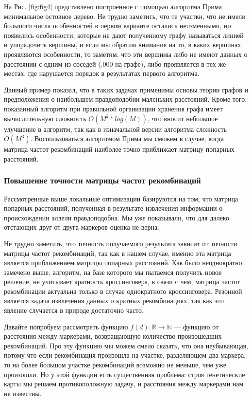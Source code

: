 \documentclass{matmex-diploma-custom}
\begin{document}
На Рис. \ref{fig:fig4} представлено построенное с помощью алгоритма
Прима минимальное остовное дерево. Не трудно заметить, что те участки,
что не имели большого числа особенностей в первом варианте остались
неизменными, но появились особенности, которые не дают полученному
графу называться линией и упорядочить вершины, и если мы обратим
внимание на то, в каких вершинах проявляются особенности, то заметим,
что эти вершины либо не имеют данных о расстоянии с одним из соседей
(.000 на графе), либо проявляется в тех же местах, где нарушается
порядок в результатах первого алгоритма.

Данный пример показал, что в таких задачах применимы основы теории
графов и предположения о наибольшем правдоподобии маленьких
расстояний. Кроме того, показанный алгоритм при правильной организации
хранения графа имеет вычислительную сложность $O(M^2*log(M))$, что
вносит небольшое улучшение в алгоритм, так как в изначальной версии
алгоритма сложность $O(M^3)$. Воспользоваться алгоритмом Прима мы
сможем в случае, когда матрица частот рекомбинаций наиболее точно
приближает матрицу попарных расстояний.

\subsubsection{Повышение точности матрицы частот рекомбинаций}

Рассмотренные выше локальные оптимизации базируются на том, что
матрица попарных расстояний, полученная в результате извлечения
информации о происхождении аллели правдоподобна. Мы уже показывали,
что для далеко отстающих друг от друга маркеров оценка не верна.

Не трудно заметить, что точность получаемого результата зависит от
точности матрицы частот рекомбинаций, так как в нашем случае, именно
эта матрица является приближением матрицы попарных расстояний.  Как
было неоднократно замечено выше, алгоритм, на базе которого мы
пытаемся получить новое решение, не учитывает кратность кроссинговера,
в связи с чем, матрица частот рекомбинации актуальна только в случае
однократного кроссинговера. Резонной является задача извлечения данных
о кратных рекомбинациях, так как это явление случается в природе
достаточно часто.

Давайте попробуем рассмотреть функцию $f(d):\mathbb{R} \to \mathbb{N}$
--- функцию от расстояния между маркерами, возвращающую количество
произошедших рекомбинаций. Про эту функцию мы можем смело сказать, что
она неубывающая, потому что если рекомбинация произошла на участке,
разделяющем два маркера, то на более большом участке рекомбинаций
возможно не меньше, чем уже произошли. Но у этой функции есть
существенная проблема: строя генетические карты мы решаем
противоположную задачу, и расстояния между маркерами нам не известны.
\end{document}
